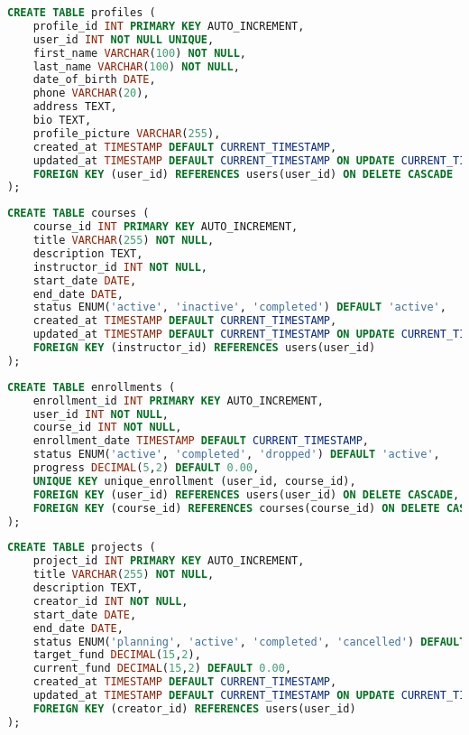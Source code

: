 \documentclass[12pt]{report}
\begin{document}
    \begin{lstlisting}[language=SQL, caption=Profiles Table Creation]
CREATE TABLE profiles (
    profile_id INT PRIMARY KEY AUTO_INCREMENT,
    user_id INT NOT NULL UNIQUE,
    first_name VARCHAR(100) NOT NULL,
    last_name VARCHAR(100) NOT NULL,
    date_of_birth DATE,
    phone VARCHAR(20),
    address TEXT,
    bio TEXT,
    profile_picture VARCHAR(255),
    created_at TIMESTAMP DEFAULT CURRENT_TIMESTAMP,
    updated_at TIMESTAMP DEFAULT CURRENT_TIMESTAMP ON UPDATE CURRENT_TIMESTAMP,
    FOREIGN KEY (user_id) REFERENCES users(user_id) ON DELETE CASCADE
);
    \end{lstlisting}
    
    \begin{lstlisting}[language=SQL, caption=Courses Table Creation]
CREATE TABLE courses (
    course_id INT PRIMARY KEY AUTO_INCREMENT,
    title VARCHAR(255) NOT NULL,
    description TEXT,
    instructor_id INT NOT NULL,
    start_date DATE,
    end_date DATE,
    status ENUM('active', 'inactive', 'completed') DEFAULT 'active',
    created_at TIMESTAMP DEFAULT CURRENT_TIMESTAMP,
    updated_at TIMESTAMP DEFAULT CURRENT_TIMESTAMP ON UPDATE CURRENT_TIMESTAMP,
    FOREIGN KEY (instructor_id) REFERENCES users(user_id)
);
    \end{lstlisting}
    
    \begin{lstlisting}[language=SQL, caption=Enrollments Table Creation]
CREATE TABLE enrollments (
    enrollment_id INT PRIMARY KEY AUTO_INCREMENT,
    user_id INT NOT NULL,
    course_id INT NOT NULL,
    enrollment_date TIMESTAMP DEFAULT CURRENT_TIMESTAMP,
    status ENUM('active', 'completed', 'dropped') DEFAULT 'active',
    progress DECIMAL(5,2) DEFAULT 0.00,
    UNIQUE KEY unique_enrollment (user_id, course_id),
    FOREIGN KEY (user_id) REFERENCES users(user_id) ON DELETE CASCADE,
    FOREIGN KEY (course_id) REFERENCES courses(course_id) ON DELETE CASCADE
);
    \end{lstlisting}
    
    \begin{lstlisting}[language=SQL, caption=Projects Table Creation]
CREATE TABLE projects (
    project_id INT PRIMARY KEY AUTO_INCREMENT,
    title VARCHAR(255) NOT NULL,
    description TEXT,
    creator_id INT NOT NULL,
    start_date DATE,
    end_date DATE,
    status ENUM('planning', 'active', 'completed', 'cancelled') DEFAULT 'planning',
    target_fund DECIMAL(15,2),
    current_fund DECIMAL(15,2) DEFAULT 0.00,
    created_at TIMESTAMP DEFAULT CURRENT_TIMESTAMP,
    updated_at TIMESTAMP DEFAULT CURRENT_TIMESTAMP ON UPDATE CURRENT_TIMESTAMP,
    FOREIGN KEY (creator_id) REFERENCES users(user_id)
);
    \end{lstlisting}
    
\end{document}
